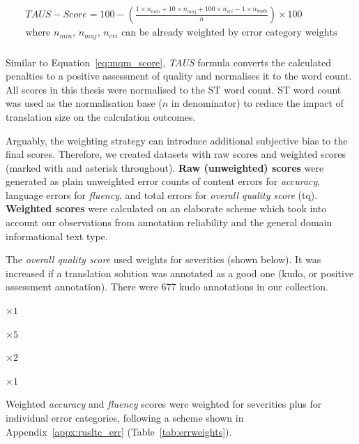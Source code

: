 \begin{equation}\label{eq:taus_score}
\begin{split}
TAUS-Score = 100 - (\frac{1\times n_{min} + 10\times n_{maj} + 100\times n_{cri} -1\times n_{kudo}}{n})\times 100 \\
\text{where $n_{min}$, $n_{maj}$, $n_{cri}$ can be already weighted by error category weights} \\
\end{split}
\end{equation}

Similar to Equation~\ref{eq:mqm_score}, \textit{TAUS} formula converts the calculated penalties to a positive assessment of quality and normalises it to the word count.
All scores in this thesis were normalised to the ST word count. ST word count was used as the normalisation base ($n$ in denominator) to reduce the impact of translation size on the calculation outcomes.

Arguably, the weighting strategy can introduce additional subjective bias to the final scores. Therefore, we created datasets with raw scores and weighted scores (marked with and asterisk throughout). \label{pg:tq}
\textbf{Raw (unweighted) scores} were generated as plain unweighted error counts of content errors for \textit{accuracy}, language errors for \textit{fluency}, and total errors for \textit{overall quality score} (tq). \textbf{Weighted scores} were calculated on an elaborate scheme which took into account our observations from annotation reliability and the general domain informational text type. 

The \textit{overall quality score} used weights for severities (shown below). It was increased if a translation solution was annotated as a good one (kudo, or positive assessment annotation). There were 677 kudo annotations in our collection.

\begin{description}\compresslist{}
	\item[kudos] $\times 1$
	\item[critical errors] $\times 5$
	\item[major errors] $\times 2$ 
	\item[minor errors] $\times 1$
\end{description}

Weighted \textit{accuracy} and \textit{fluency} scores were weighted for severities plus for individual error categories, following a scheme shown in Appendix~\ref{appx:rusltc_err} (Table~\ref{tab:errweights}).

